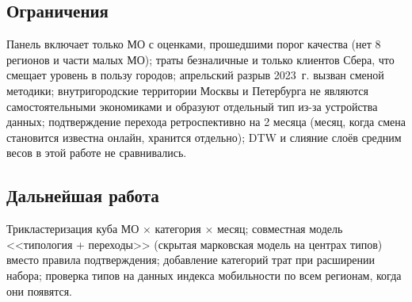 \documentclass[11pt,a4paper]{article}
\begin{document}
\subsection*{Ограничения}
Панель включает только МО с оценками, прошедшими порог качества (нет 8 регионов и части малых МО); траты безналичные и только клиентов Сбера, что смещает уровень в пользу городов; апрельский разрыв 2023~г. вызван сменой методики; внутригородские территории Москвы и Петербурга не являются самостоятельными экономиками и образуют отдельный тип из-за устройства данных; подтверждение перехода ретроспективно на 2 месяца (месяц, когда смена становится известна онлайн, хранится отдельно); DTW и слияние слоёв средним весов в этой работе не сравнивались.

\subsection*{Дальнейшая работа}
Трикластеризация \cite{ignatov2015,ganter} куба МО $\times$ категория $\times$ месяц; совместная модель <<типология + переходы>> (скрытая марковская модель на центрах типов) вместо правила подтверждения; добавление категорий трат при расширении набора; проверка типов на данных индекса мобильности по всем регионам, когда они появятся.
\end{document}
